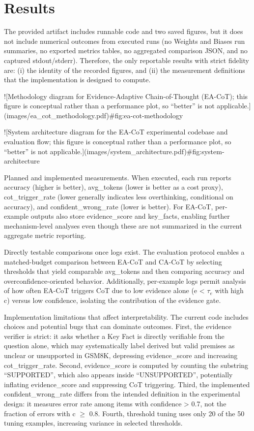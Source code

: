 \documentclass[journal,article,submit,pdftex,moreauthors]{Definitions/mdpi}
\begin{document}
\section{Results}

The provided artifact includes runnable code and two saved figures, but it does not include numerical outcomes from executed runs (no Weights and Biases run summaries, no exported metrics tables, no aggregated comparison JSON, and no captured stdout/stderr). Therefore, the only reportable results with strict fidelity are: (i) the identity of the recorded figures, and (ii) the measurement definitions that the implementation is designed to compute.

![Methodology diagram for Evidence-Adaptive Chain-of-Thought (EA-CoT); this figure is conceptual rather than a performance plot, so “better” is not applicable.](images/ea_cot_methodology.pdf){#fig:ea-cot-methodology}

![System architecture diagram for the EA-CoT experimental codebase and evaluation flow; this figure is conceptual rather than a performance plot, so “better” is not applicable.](images/system_architecture.pdf){#fig:system-architecture}

Planned and implemented measurements. When executed, each run reports accuracy (higher is better), avg\_tokens (lower is better as a cost proxy), cot\_trigger\_rate (lower generally indicates less overthinking, conditional on accuracy), and confident\_wrong\_rate (lower is better). For EA-CoT, per-example outputs also store evidence\_score and key\_facts, enabling further mechanism-level analyses even though these are not summarized in the current aggregate metric reporting.

Directly testable comparisons once logs exist. The evaluation protocol enables a matched-budget comparison between EA-CoT and CA-CoT by selecting thresholds that yield comparable avg\_tokens and then comparing accuracy and overconfidence-oriented behavior. Additionally, per-example logs permit analysis of how often EA-CoT triggers CoT due to low evidence alone (e < $\tau_e$ with high c) versus low confidence, isolating the contribution of the evidence gate.

Implementation limitations that affect interpretability. The current code includes choices and potential bugs that can dominate outcomes. First, the evidence verifier is strict: it asks whether a Key Fact is directly verifiable from the question alone, which may systematically label derived but valid premises as unclear or unsupported in GSM8K, depressing evidence\_score and increasing cot\_trigger\_rate. Second, evidence\_score is computed by counting the substring “SUPPORTED”, which also appears inside “UNSUPPORTED”, potentially inflating evidence\_score and suppressing CoT triggering. Third, the implemented confident\_wrong\_rate differs from the intended definition in the experimental design: it measures error rate among items with confidence > 0.7, not the fraction of errors with c $\geq$ 0.8. Fourth, threshold tuning uses only 20 of the 50 tuning examples, increasing variance in selected thresholds.
\end{document}
